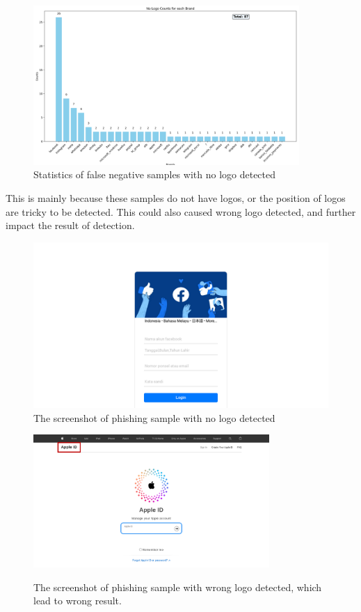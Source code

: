 \begin{figure}[H]
\caption{Statistics of false negative samples with no logo detected}
\centering
\includegraphics[width=0.9\textwidth]{images/no_logo.png}
\end{figure}

This is mainly because these samples do not have logos, or the position of logos are tricky to be detected. This could also caused wrong logo detected, and further impact the result of detection.

\begin{figure}[H]
\caption{The screenshot of phishing sample with no logo detected}
\centering
\includegraphics[width=1\textwidth]{images/fb.png}
\end{figure}

\begin{figure}[H]
\caption{The screenshot of phishing sample with wrong logo detected, which lead to wrong result.}
\centering
\includegraphics[width=0.8\textwidth]{images/Wrong_logo.png}
\label{wrong_logo}
\end{figure}

